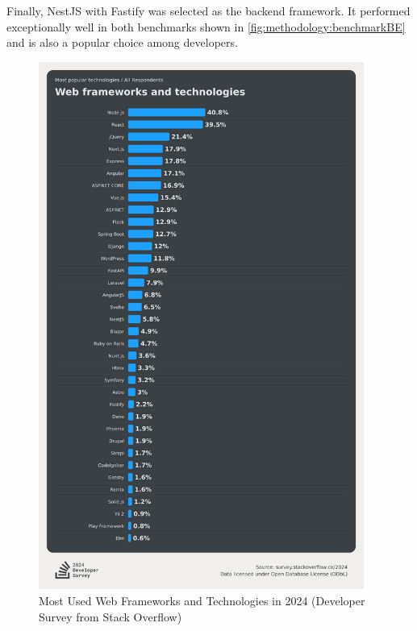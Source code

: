 Finally, NestJS \cite{methodology:nestjs} with Fastify was selected as the backend framework. It performed exceptionally well in both benchmarks shown in \autoref{fig:methodology:benchmarkBE} and is also a popular choice among developers.

\begin{figure}[htbp]
  \centering
  \includegraphics[width=0.95\textwidth]{gfx/figures/FrameworkSurvey2024.png}
  \caption{Most Used Web Frameworks and Technologies in 2024 (Developer Survey from Stack Overflow) \cite{frontend:popularity}}
  \label{fig:methodology:popularFE}
\end{figure}
\clearpage

